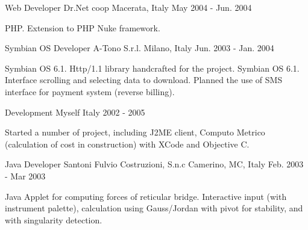 \begin{cventries}
  \cventry
    {Web Developer}
    {Dr.Net coop}
    {Macerata, Italy}
    {May 2004 - Jun. 2004} %
    {
      \begin{cvitems}
        {PHP. Extension to PHP Nuke framework.}
      \end{cvitems}
    }

  \cventry
    {Symbian OS Developer}
    {A-Tono S.r.l.}
    {Milano, Italy}
    {Jun. 2003 - Jan. 2004} %
    {
      \begin{cvitems}
        {Symbian OS 6.1. Http/1.1 library handcrafted for the project.}
        {Symbian OS 6.1. Interface scrolling and selecting data to download.}
        {Planned the use of SMS interface for payment system (reverse billing).}
      \end{cvitems}
    }

  \cventry
    {Development}
    {Myself}
    {Italy}
    {2002 - 2005} %
    {
      \begin{cvitems}
        {Started a number of project, including J2ME client, Computo Metrico (calculation of cost in construction) with XCode and Objective C.}
      \end{cvitems}
    }

  \cventry
    {Java Developer} %
    {Santoni Fulvio Costruzioni, S.n.c} %
    {Camerino, MC, Italy} %
    {Feb. 2003 - Mar 2003} %
    {
      \begin{cvitems} %
        \item {Java Applet for computing forces of reticular bridge. Interactive input (with instrument palette), calculation using Gauss/Jordan with pivot for stability, and with singularity detection.}
      \end{cvitems}
    }


\end{cventries}
